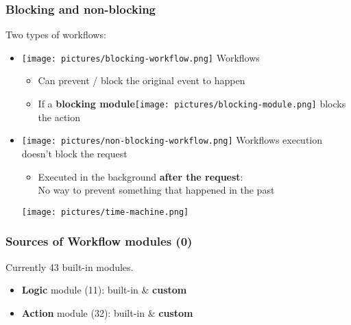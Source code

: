 \begin{frame}
    \frametitle{Blocking and non-blocking}
    Two types of workflows:
    \vspace{0.5em}
    \begin{itemize}
        \item[] \hspace*{-2em}\texttt{[image: pictures/blocking-workflow.png]} Workflows
        \begin{itemize}
            \item Can prevent / block the original event to happen
            \item If a \textbf{blocking module}\texttt{[image: pictures/blocking-module.png]} blocks the action
        \end{itemize}
        \vspace{0.5em}
        \item[] \hspace*{-2em}\texttt{[image: pictures/non-blocking-workflow.png]} Workflows execution doesn't block the request
        \begin{itemize}
            \item Executed in the background \textbf{after the request}:\\ No way to prevent something that happened in the past
        \end{itemize}
        \begin{center}
            \texttt{[image: pictures/time-machine.png]}
        \end{center}
    \end{itemize}
\end{frame}

\begin{frame}
    \frametitle{Sources of Workflow modules (0)}
    Currently 43 built-in modules.
    \vspace{1em}
    \begin{itemize}
        \item \textbf{Logic} module (11): built-in \& \textbf{custom}
        \item \textbf{Action} module (32): built-in \& \textbf{custom}
    \end{itemize}
    \vspace*{2.0em}
\end{frame}


